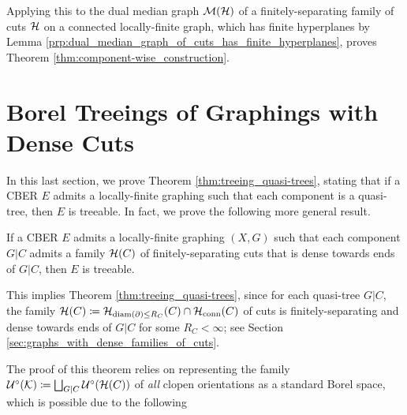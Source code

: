 \documentclass[reqno]{amsart}
\begin{document}
    Applying this to the dual median graph $\mathcal{M}(\mathcal{H})$ of a finitely-separating family of cuts $\mathcal{H}$ on a connected locally-finite graph, which has finite hyperplanes by Lemma \ref{prp:dual_median_graph_of_cuts_has_finite_hyperplanes}, proves Theorem \ref{thm:component-wise_construction}.

    \section{Borel Treeings of Graphings with Dense Cuts}\label{sec:borel_treeings_of_graphings_with_dense_cuts}

    In this last section, we prove Theorem \ref{thm:treeing_quasi-trees}, stating that if a CBER $E$ admits a locally-finite graphing such that each component is a quasi-tree, then $E$ is treeable. In fact, we prove the following more general result.

    \begin{theorem}\label{thm:treeing_graphings_with_dense_cuts}
        If a CBER $E$ admits a locally-finite graphing $(X,G)$ such that each component $G|C$ admits a family $\mathcal{H}(C)$ of finitely-separating cuts that is dense towards ends of $G|C$, then $E$ is treeable.
    \end{theorem}

    This implies Theorem \ref{thm:treeing_quasi-trees}, since for each quasi-tree $G|C$, the family $\mathcal{H}(C)\coloneqq\mathcal{H}_{\operatorname{diam}(\partial)\leq R_C}(C)\cap\mathcal{H}_\mathrm{conn}(C)$ of cuts is finitely-separating and dense towards ends of $G|C$ for some $R_C<\infty$; see Section \ref{sec:graphs_with_dense_families_of_cuts}.

    The proof of this theorem relies on representing the family $\mathcal{U}^\circ(\mathcal{K})\coloneqq\bigsqcup_{G|C}\mathcal{U}^\circ(\mathcal{H}(C))$ of \textit{all} clopen orientations as a standard Borel space, which is possible due to the following
\end{document}
